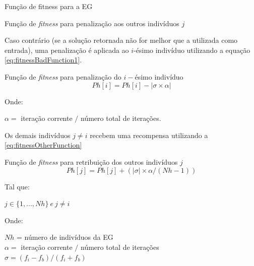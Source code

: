 \begin{frame}[allowframebreaks]{Função de fitness para a EG}
\begin{block}{Função de \textit{fitness} para penalização aos outros indivíduos $j$}
	\end{block}
	
	\framebreak
	
	Caso contrário (se a solução retornada não for melhor que a utilizada como entrada), uma penalização é aplicada ao $i$-ésimo indivíduo utilizando a equação \autoref{eq:fitnessBadFunction1}.
	\begin{block}{Função de \textit{fitness} para penalização do $i-$ésimo indivíduo}
		\begin{equation} {}
		\label{eq:fitnessBadFunction1}
		Ph[i] = Ph[i] - |\sigma \times \alpha|
		\end{equation}
		
		Onde: 
		\begin{center}
			$\alpha =$ iteração corrente $/$ número total de iterações.
		\end{center} 
	\end{block}	

	
	
	Os demais indivíduos $j \neq i$ recebem uma recompensa utilizando a \autoref{eq:fitnessOtherFunction} 

	\begin{block}{Função de \textit{fitness} para retribuição dos outros indivíduos $j$}
		\begin{equation} {}
		\label{eq:fitnessOtherFunction}
		 Ph[j] = Ph[j] + (|\sigma| \times \alpha / (Nh -1))
		\end{equation}
		
		 Tal que: 
		\begin{center}
		 $j \in \{1, ..., Nh\} ~e~ j \neq i$
		\end{center} 
		
		Onde:
		\begin{center}
		$Nh$ = número de indivíduos da EG \\ $\alpha =$ iteração corrente $/$ número total de iterações \\
		 $\sigma = (f_i - f_b)/(f_i + f_b)$
			
			
		\end{center}
	\end{block}	
\end{frame}	

